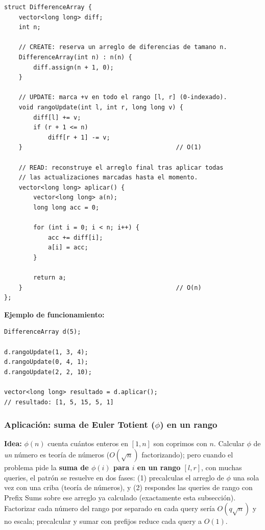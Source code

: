 \documentclass[10pt,a4paper,twocolumn]{article}
\begin{document}
\begin{lstlisting}[style=cpp]
struct DifferenceArray {
    vector<long long> diff;
    int n;

    // CREATE: reserva un arreglo de diferencias de tamano n.
    DifferenceArray(int n) : n(n) {
        diff.assign(n + 1, 0);
    }

    // UPDATE: marca +v en todo el rango [l, r] (0-indexado).
    void rangoUpdate(int l, int r, long long v) {
        diff[l] += v;
        if (r + 1 <= n)
            diff[r + 1] -= v;
    }                                          // O(1)

    // READ: reconstruye el arreglo final tras aplicar todas
    // las actualizaciones marcadas hasta el momento.
    vector<long long> aplicar() {
        vector<long long> a(n);
        long long acc = 0;

        for (int i = 0; i < n; i++) {
            acc += diff[i];
            a[i] = acc;
        }

        return a;
    }                                          // O(n)
};
\end{lstlisting}

\textbf{Ejemplo de funcionamiento:}

\begin{lstlisting}[style=cpp]
DifferenceArray d(5);

d.rangoUpdate(1, 3, 4);
d.rangoUpdate(0, 4, 1);
d.rangoUpdate(2, 2, 10);

vector<long long> resultado = d.aplicar();
// resultado: [1, 5, 15, 5, 1]
\end{lstlisting}


\subsubsection{Aplicación: suma de Euler Totient ($\phi$) en un rango}

\textbf{Idea:} $\phi(n)$ cuenta cuántos enteros en $[1,n]$ son
coprimos con $n$. Calcular $\phi$ de \emph{un} número es teoría de
números ($O(\sqrt n)$ factorizando); pero cuando el problema pide la
\textbf{suma de $\phi(i)$ para $i$ en un rango $[l,r]$}, con muchas
queries, el patrón se resuelve en dos fases: (1) precalculas el
arreglo de $\phi$ una sola vez con una criba (teoría de números), y
(2) respondes las queries de rango con Prefix Sums sobre ese arreglo
ya calculado (exactamente esta subsección). Factorizar cada número
del rango por separado en cada query sería $O(q\sqrt n)$ y no escala;
precalcular y sumar con prefijos reduce cada query a $O(1)$.
\end{document}
